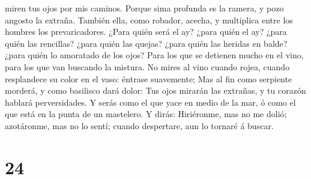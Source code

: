 miren tus ojos por mis caminos.  Porque sima profunda es
la ramera, y pozo angosto la extraña.  También ella, como
robador, acecha, y multiplica entre los hombres los prevaricadores.
 ¿Para quién será el ay? ¿para quién el ay? ¿para quién
las rencillas? ¿para quién las quejas? ¿para quién las heridas en balde?
¿para quién lo amoratado de los ojos?  Para los que se
detienen mucho en el vino, para los que van buscando la mistura.
 No mires al vino cuando rojea, cuando resplandece su
color en el vaso: éntrase suavemente;  Mas al fin como
serpiente morderá, y como basilisco dará dolor:  Tus ojos
mirarán las extrañas, y tu corazón hablará perversidades.
 Y serás como el que yace en medio de la mar, ó como el
que está en la punta de un mastelero.  Y dirás:
Hiriéronme, mas no me dolió; azotáronme, mas no lo sentí; cuando
despertare, aun lo tornaré á buscar.

\hypertarget{section-23}{%
\section{24}\label{section-23}}

